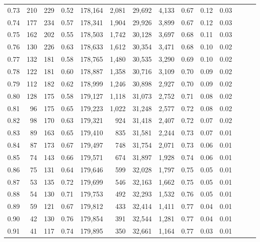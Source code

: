\begin{tabular}{rrrrrrrrrrrrrr}
0.73 &    210 &  229 &  0.52 &  178,164 &    2,081 &  29,692 &   4,133 &  0.67 &  0.12 &      0.03 \\
0.74 &    177 &  234 &  0.57 &  178,341 &    1,904 &  29,926 &   3,899 &  0.67 &  0.12 &      0.03 \\
0.75 &    162 &  202 &  0.55 &  178,503 &    1,742 &  30,128 &   3,697 &  0.68 &  0.11 &      0.03 \\
0.76 &    130 &  226 &  0.63 &  178,633 &    1,612 &  30,354 &   3,471 &  0.68 &  0.10 &      0.02 \\
0.77 &    132 &  181 &  0.58 &  178,765 &    1,480 &  30,535 &   3,290 &  0.69 &  0.10 &      0.02 \\
0.78 &    122 &  181 &  0.60 &  178,887 &    1,358 &  30,716 &   3,109 &  0.70 &  0.09 &      0.02 \\
0.79 &    112 &  182 &  0.62 &  178,999 &    1,246 &  30,898 &   2,927 &  0.70 &  0.09 &      0.02 \\
0.80 &    128 &  175 &  0.58 &  179,127 &    1,118 &  31,073 &   2,752 &  0.71 &  0.08 &      0.02 \\
0.81 &     96 &  175 &  0.65 &  179,223 &    1,022 &  31,248 &   2,577 &  0.72 &  0.08 &      0.02 \\
0.82 &     98 &  170 &  0.63 &  179,321 &      924 &  31,418 &   2,407 &  0.72 &  0.07 &      0.02 \\
0.83 &     89 &  163 &  0.65 &  179,410 &      835 &  31,581 &   2,244 &  0.73 &  0.07 &      0.01 \\
0.84 &     87 &  173 &  0.67 &  179,497 &      748 &  31,754 &   2,071 &  0.73 &  0.06 &      0.01 \\
0.85 &     74 &  143 &  0.66 &  179,571 &      674 &  31,897 &   1,928 &  0.74 &  0.06 &      0.01 \\
0.86 &     75 &  131 &  0.64 &  179,646 &      599 &  32,028 &   1,797 &  0.75 &  0.05 &      0.01 \\
0.87 &     53 &  135 &  0.72 &  179,699 &      546 &  32,163 &   1,662 &  0.75 &  0.05 &      0.01 \\
0.88 &     54 &  130 &  0.71 &  179,753 &      492 &  32,293 &   1,532 &  0.76 &  0.05 &      0.01 \\
0.89 &     59 &  121 &  0.67 &  179,812 &      433 &  32,414 &   1,411 &  0.77 &  0.04 &      0.01 \\
0.90 &     42 &  130 &  0.76 &  179,854 &      391 &  32,544 &   1,281 &  0.77 &  0.04 &      0.01 \\
0.91 &     41 &  117 &  0.74 &  179,895 &      350 &  32,661 &   1,164 &  0.77 &  0.03 &      0.01 \\

\end{tabular}
